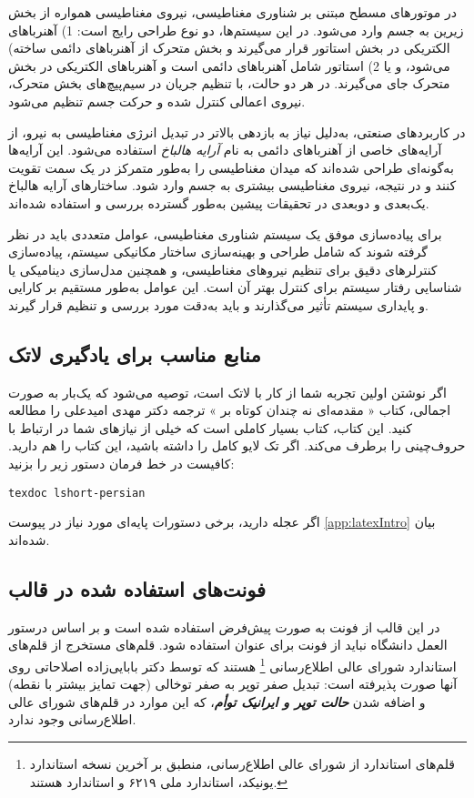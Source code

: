 در موتورهای مسطح مبتنی‌ بر شناوری مغناطیسی، نیروی مغناطیسی همواره از بخش زیرین به جسم وارد می‌شود. در این سیستم‌ها، دو نوع طراحی رایج است: 1) آهنرباهای الکتریکی در بخش استاتور قرار می‌گیرند و بخش متحرک از آهنرباهای دائمی ساخته) می‌شود، و یا 2) استاتور شامل آهنرباهای دائمی است و آهنرباهای الکتریکی در بخش متحرک جای می‌گیرند. در هر دو حالت، با تنظیم جریان در سیم‌پیچ‌های بخش متحرک، نیروی اعمالی کنترل شده و حرکت جسم تنظیم می‌شود.

در کاربردهای صنعتی، به‌دلیل نیاز به بازدهی بالاتر در تبدیل انرژی مغناطیسی به نیرو، از آرایه‌های خاصی از آهنرباهای دائمی به نام 
\textit{آرایه هالباخ}
استفاده می‌شود. این آرایه‌ها به‌گونه‌ای طراحی شده‌اند که میدان مغناطیسی را به‌طور متمرکز در یک سمت تقویت کنند و در نتیجه، نیروی مغناطیسی بیشتری به جسم وارد شود. ساختارهای آرایه هالباخ یک‌بعدی و دوبعدی در تحقیقات پیشین به‌طور گسترده بررسی و استفاده شده‌اند.

برای پیاده‌سازی موفق یک سیستم شناوری مغناطیسی، عوامل متعددی باید در نظر گرفته شوند که شامل طراحی و بهینه‌سازی ساختار مکانیکی سیستم، پیاده‌سازی کنترلرهای دقیق برای تنظیم نیروهای مغناطیسی، و همچنین مدل‌سازی دینامیکی یا شناسایی رفتار سیستم برای کنترل بهتر آن است. این عوامل به‌طور مستقیم بر کارایی و پایداری سیستم تأثیر می‌گذارند و باید به‌دقت مورد بررسی و تنظیم قرار گیرند.

\subsection{منابع مناسب برای یادگیری لاتک}
اگر نوشتن \پ اولین تجربه شما از کار با لاتک است، توصیه می‌شود که یک‌بار به صورت اجمالی، کتاب «%
مقدمه‌ای نه چندان کوتاه بر
\lr{\LaTeXe}%
»
ترجمه دکتر مهدی امیدعلی را مطالعه کنید. این کتاب، کتاب بسیار کاملی است که خیلی از نیازهای شما در ارتباط با حروف‌چینی را برطرف می‌کند.
اگر تک لایو کامل را داشته باشید، این کتاب را هم دارید. کافیست در خط فرمان دستور زیر را بزنید:
\begin{latin}
	\texttt{texdoc lshort-persian}
\end{latin}
اگر عجله دارید، برخی دستورات پایه‌ای مورد نیاز در پیوست \ref{app:latexIntro} بیان شده‌اند.


\subsection{فونت‌های استفاده شده در قالب}
در این قالب از فونت‌
به صورت پیش‌فرض استفاده شده است و بر اساس درستور العمل دانشگاه نباید از فونت
برای عنوان استفاده شود.
قلم‌های
مستخرج از قلم‌های استاندارد
شورای عالی اطلاع‌رسانی%
\footnote{
قلم‌های استاندارد
از شورای عالی اطلاع‌رسانی، منطبق بر آخرین نسخه استاندارد یونیکد، استاندارد ملی ۶۲۱۹ و استاندارد
هستند.
}
هستند که توسط دکتر بابایی‌زاده اصلاحاتی روی آنها صورت پذیرفته است: تبدیل صفر توپر به صفر توخالی (جهت تمایز بیشتر با نقطه) و اضافه شدن
\textit{\textbf{حالت توپر و ایرانیک توأم}}،
که این موارد در قلم‌های شورای عالی اطلاع‌رسانی وجود ندارد.


